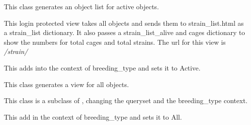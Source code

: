 \documentclass[letterpaper,10pt,english]{sphinxmanual}
\begin{document}

\begin{fulllineitems}
\label{animals:mousedb.animal.views.BreedingList}
This class generates an object list for active {\hyperref[animals:mousedb.animal.models.Breeding]{}} objects.

This login protected view takes all {\hyperref[animals:mousedb.animal.models.Breeding]{}} objects and sends them to strain\_list.html as a strain\_list dictionary.  It also passes a strain\_list\_alive and cages dictionary to show the numbers for total cages and total strains.
The url for this view is \emph{/strain/}

\begin{fulllineitems}
\label{animals:mousedb.animal.views.BreedingList.get_context_data}
This adds into the context of breeding\_type and sets it to Active.

\end{fulllineitems}


\end{fulllineitems}


\begin{fulllineitems}
\label{animals:mousedb.animal.views.BreedingListAll}
This class generates a view for all {\hyperref[animals:mousedb.animal.models.Breeding]{}} objects.

This class is a subclass of {\hyperref[animals:mousedb.animal.views.BreedingList]{}}, changing the queryset and the  breeding\_type context.

\begin{fulllineitems}
\label{animals:mousedb.animal.views.BreedingListAll.get_context_data}
This add in the context of breeding\_type and sets it to All.

\end{fulllineitems}


\end{fulllineitems}
\end{document}
